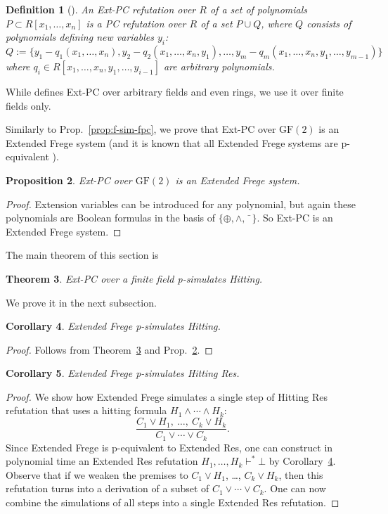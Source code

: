 \documentclass[11pt]{article}
\newcommand{\scterm}[1]{{\textrm{\sc #1}}}
\newcommand{\hit}{\scterm{Hitting}}
\newcommand{\res}{\scterm{Res}}
\newcommand{\F}{\scterm{Frege}}
\newcommand{\EF}{\scterm{Extended {\F}}}
\newcommand{\extres}{\scterm{Extended {\res}}}
\newcommand{\extpc}{\scterm{Ext-PC}}
\newcommand{\pc}{\scterm{PC}}
\newcommand{\hitres}{{\hit} {\res}}
\newcommand{\GF}{\mathrm{GF}}
\numberwithin{equation}{section}
\newtheorem{theorem}{Theorem}[section]
\newtheorem{proposition}[theorem]{Proposition}
\newtheorem{corollary}[theorem]{Corollary}
\newtheorem{definition}[theorem]{Definition}
\begin{document}
\begin{definition}[\cite{Ale21}]\label{def:extpc}
An {\extpc} refutation over $R$ of a set of polynomials $P\subset R[x_1,\dotsc,x_n]$
is a {\pc} refutation over $R$ of a set $P\cup Q$,
where $Q$ consists of polynomials defining new variables $y_i$: 
\[
Q := \{y_1 - q_1(x_1, \dotsc, x_n), y_2 - q_2(x_1, \dotsc, x_n, y_1), \dotsc, 
y_m - q_m(x_1, \dotsc, x_n, y_1, \dotsc, y_{m - 1})\}
\]
where $q_i \in R[x_1,\dotsc,x_n, y_1, \dotsc, y_{i - 1}]$ are arbitrary polynomials. 
\end{definition}
While \cite{Ale21} defines {\extpc} over arbitrary fields and even rings, 
we use it over finite fields only.

Similarly to Prop.~\ref{prop:f-sim-fpc}, we prove that {\extpc} over $\GF(2)$ is an {\EF} system
(and it is known that
all {\EF} systems are p-equivalent \cite[Theorem 5.3.2.a]{Rec76}).
\begin{proposition}\label{prop:ef-sim-extpc}
{\extpc} over $\GF(2)$ is an {\EF} system.
\end{proposition}
\begin{proof}
Extension variables can be introduced for any polynomial,
but again these polynomials are Boolean formulas in the basis of $\{\oplus,\land,\bar{\phantom{x}}\}$.
So {\extpc} is an {\EF} system.
\end{proof}


The main theorem of this section is
\begin{theorem}\label{th:extpc-sim-hit}
{\extpc} over a finite field p-simulates {\hit}.
\end{theorem}
We prove it in the next subsection.

\begin{corollary}\label{cor:ef-sim-hit}
{\EF} p-simulates {\hit}.
\end{corollary}
\begin{proof}
Follows from Theorem~\ref{th:extpc-sim-hit} and Prop.~\ref{prop:ef-sim-extpc}.
\end{proof}

\begin{corollary}\label{cor:ef-sim-hitres}
{\EF} p-simulates {\hitres}.
\end{corollary}
\begin{proof}
We show how {\EF} simulates a single step of {\hitres} refutation that uses a hitting formula $H_1\land\dotsb\land H_k$:
\[
\frac{C_1\lor H_1,\ \dotsc,\ C_k\lor H_k}{C_1\lor\dotsb\lor C_k}.
\]
Since {\EF} is p-equivalent to {\extres}, one can construct in polynomial time an {\extres} refutation $H_1,\dotsc,H_k\vdash^* \bot$ by Corollary~\ref{cor:ef-sim-hit}.
Observe that if we weaken the premises to $C_1\lor H_1$, \ldots, $C_k\lor H_k$,
then this refutation turns into a derivation of a subset of $C_1\lor\dotsb\lor C_k$.
One can now combine the simulations of all steps into a single {\extres} refutation.
\end{proof}
\end{document}
